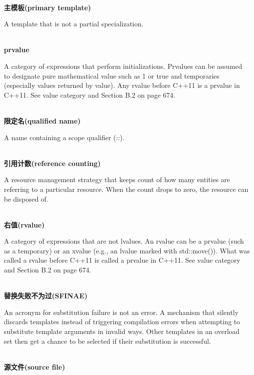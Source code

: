 \hspace*{\fill} \\ %
\noindent
\textbf{主模板(primary template)}

A template that is not a partial specialization.

\hspace*{\fill} \\ %
\noindent
\textbf{prvalue}

A category of expressions that perform initializations. Prvalues can be assumed to designate pure mathematical value such as 1 or true and temporaries (especially values returned by value). Any rvalue before C++11 is a prvalue in C++11. See value category and Section B.2 on page 674.

\hspace*{\fill} \\ %
\noindent
\textbf{限定名(qualified name)}

A name containing a scope qualifier (::).

\hspace*{\fill} \\ %
\noindent
\textbf{引用计数(reference counting)}

A resource management strategy that keeps count of how many entities are referring to a particular resource. When the count drops to zero, the resource can be disposed of.

\hspace*{\fill} \\ %
\noindent
\textbf{右值(rvalue)}

A category of expressions that are not lvalues. An rvalue can be a prvalue (such as a temporary) or an xvalue (e.g., an lvalue marked with std::move()). What was called a rvalue before C++11 is called a prvalue in C++11. See value category and Section B.2 on page 674.

\hspace*{\fill} \\ %
\noindent
\textbf{替换失败不为过(SFINAE)}

An acronym for substitution failure is not an error. A mechanism that silently discards templates instead of triggering compilation errors when attempting to substitute template arguments in invalid ways. Other templates in an overload set then get a chance to be selected if their substitution is successful.

\hspace*{\fill} \\ %
\noindent
\textbf{源文件(source file)}

